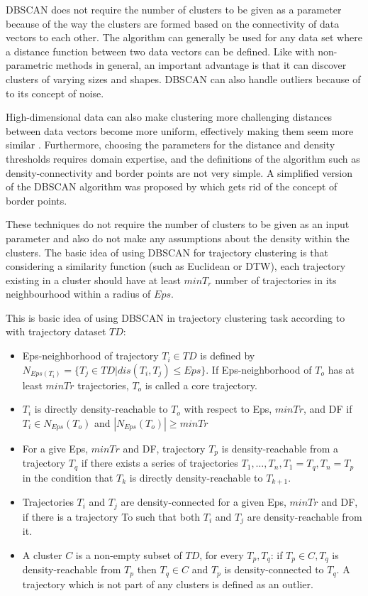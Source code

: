 \documentclass[a4paper, 12pt]{article}
\begin{document}
DBSCAN does not require the number of clusters to be given as a parameter because of the way the clusters are formed based on the connectivity of data vectors to each other. The algorithm can generally be used for any data set where a distance function between two data vectors can be defined. Like with non-parametric methods in general, an important advantage is that it can discover clusters of varying sizes and shapes. DBSCAN can also handle outliers because of to its concept of noise.

High-dimensional data can also make clustering more challenging distances between data vectors become more uniform, effectively making them seem more similar \citep{ertoz2003finding}. Furthermore, choosing the parameters for the distance and density thresholds requires domain expertise, and the definitions of the algorithm such as density-connectivity and border points are not very simple. A simplified version of the DBSCAN algorithm was proposed by \cite{campello2013density} which gets rid of the concept of border points.

These techniques do not require the number of clusters to be given as an input parameter and also do not make any assumptions about the density within the clusters. The basic idea of using DBSCAN for trajectory clustering is that considering a similarity function (such as Euclidean or DTW), each trajectory existing in a cluster should have at least $min T_{r}$ number of trajectories in its neighbourhood within a radius of $Eps$.

This is basic idea of using DBSCAN in trajectory clustering task according to \cite{moayedi2019evaluation} with trajectory dataset $TD$:

\begin{itemize}
    \item Eps-neighborhood of trajectory $T_{i} \in TD$ is defined by $N_{Eps(T_{i})} = \{T_{j} \in TD|dis(T_{i}, T_{j}) \leq Eps\}$. If Eps-neighborhood of $T_{o}$ has at least $minTr$ trajectories, $T_{o}$ is called a core trajectory.
    \item $T_{i}$ is directly density-reachable to $T_{o}$ with respect to Eps, $minTr$, and DF if $T_{i} \in N_{Eps}(T_{o})$ and $|N_{Eps}(T_{o})| \geq minTr$ 
    \item For a give Eps, $minTr$ and DF, trajectory $T_{p}$ is density-reachable from a trajectory $T_{q}$ if there exists a series of trajectories $T_{1},\dots,T_{n}, T_{1}=T_{q}, T_{n}=T_{p}$ in the condition that $T_{k}$ is directly density-reachable to $T_{k+1}$.
    \item Trajectories $T_{i}$ and $T_{j}$ are density-connected for a given Eps, $minTr$ and DF, if there is a trajectory To such that both $T_{i}$ and $T_{j}$ are density-reachable from it.
    \item A cluster $C$ is a non-empty subset of $TD$, for every $T_{p}, T_{q}$: if $T_{p} \in C, T_{q}$ is density-reachable from $T_{p}$ then $T_{q} \in C$ and $T_{p}$ is density-connected to $T_{q}$. A trajectory which is not part of any clusters is defined as an outlier.
\end{itemize}
\end{document}

